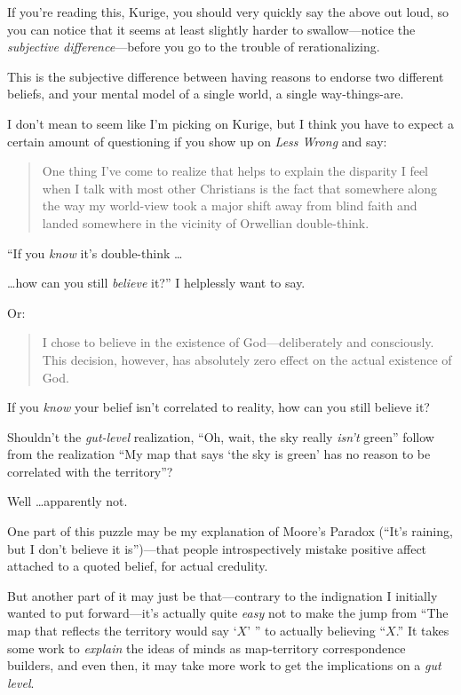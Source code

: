 {
 If you're reading this, Kurige, you should very
quickly say the above out loud, so you can notice that it seems at
least slightly harder to swallow---notice the \textit{subjective
difference}{}---before you go to the trouble of rerationalizing.}

{
 This is the subjective difference between having reasons to
endorse two different beliefs, and your mental model of a single world,
a single way-things-are.}

\myendsectiontext


{
 I don't mean to seem like I'm
picking on Kurige, but I think you have to expect a certain amount of
questioning if you show up on \textit{Less Wrong} and say:}

\begin{quote}
{
 One thing I've come to realize that helps to
explain the disparity I feel when I talk with most other Christians is
the fact that somewhere along the way my world-view took a major shift
away from blind faith and landed somewhere in the vicinity of Orwellian
double-think.}
\end{quote}

{
 ``If you \textit{know} it's
double-think \ldots}

{
 \ldots how can you still \textit{believe} it?'' I
helplessly want to say.}

{
 Or:}

\begin{quote}
{
 I chose to believe in the existence of God---deliberately and
consciously. This decision, however, has absolutely zero effect on the
actual existence of God.}
\end{quote}

{
 If you \textit{know} your belief isn't correlated
to reality, how can you still believe it?}

{
 Shouldn't the \textit{gut-level} realization,
``Oh, wait, the sky really
\textit{isn't} green'' follow from
the realization ``My map that says `the
sky is green' has no reason to be correlated with the
territory''?}

{
 Well \ldots apparently not.}

{
 One part of this puzzle may be my explanation of
Moore's Paradox
(``It's raining, but I
don't believe it is'')---that people
introspectively mistake positive affect attached to a quoted belief,
for actual credulity.}

{
 But another part of it may just be that---contrary to the
indignation I initially wanted to put forward---it's
actually quite \textit{easy} not to make the jump from
``The map that reflects the territory would say
`$X$' '' to actually
believing ``$X$.'' It takes some work
to \textit{explain} the ideas of minds as map-territory correspondence
builders, and even then, it may take more work to get the implications
on a \textit{gut level}.}

